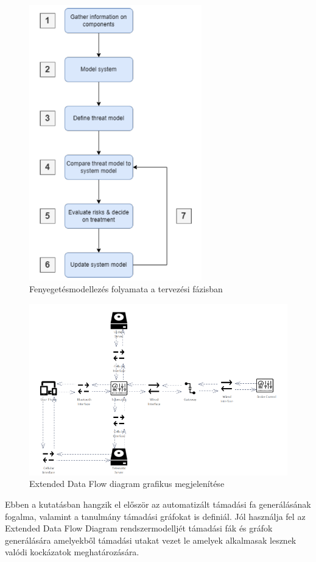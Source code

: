 \begin{figure}[!ht]
	\centering
	\includegraphics[width=75mm, keepaspectratio]{figures/03_CHULP.png}
	\caption{Fenyegetésmodellezés folyamata a tervezési fázisban\cite{Chulp}}
	\label{fig:CHULP}
\end{figure}

\begin{figure}[!ht]
	\centering
	\includegraphics[width=125mm, keepaspectratio]{figures/03_CHULP_EDD.png}
	\caption{Extended Data Flow diagram grafikus megjelenítése\cite{Chulp}}
	\label{fig:CHULP_EDD}
\end{figure}

Ebben a kutatásban hangzik el először az automatizált támadási fa generálásának fogalma, valamint a tanulmány támadási gráfokat is definiál. Jól használja fel az Extended Data Flow Diagram rendszermodelljét támadási fák és gráfok generálására amelyekből támadási utakat vezet le amelyek alkalmasak lesznek valódi kockázatok meghatározására.


